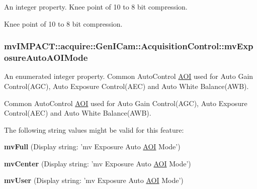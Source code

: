 An integer property. Knee point of 10 to 8 bit compression. 

Knee point of 10 to 8 bit compression. \hypertarget{classmv_i_m_p_a_c_t_1_1acquire_1_1_gen_i_cam_1_1_acquisition_control_a3121267e92f554eb04e266b80032ca66}{
\subsubsection[{mv\+Exposure\+Auto\+A\+O\+I\+Mode}]{ mv\+I\+M\+P\+A\+C\+T\+::acquire\+::\+Gen\+I\+Cam\+::\+Acquisition\+Control\+::mv\+Exposure\+Auto\+A\+O\+I\+Mode}}\label{classmv_i_m_p_a_c_t_1_1acquire_1_1_gen_i_cam_1_1_acquisition_control_a3121267e92f554eb04e266b80032ca66}


An enumerated integer property. Common Auto\+Control \hyperlink{struct_a_o_i}{A\+O\+I} used for Auto Gain Control(\+A\+G\+C), Auto Exposure Control(\+A\+E\+C) and Auto White Balance(\+A\+W\+B). 

Common Auto\+Control \hyperlink{struct_a_o_i}{A\+O\+I} used for Auto Gain Control(\+A\+G\+C), Auto Exposure Control(\+A\+E\+C) and Auto White Balance(\+A\+W\+B).

The following string values might be valid for this feature\+:
\begin{DoxyItemize}
\item {\bfseries mv\+Full} (Display string\+: 'mv Exposure Auto \hyperlink{struct_a_o_i}{A\+O\+I} Mode')
\item {\bfseries mv\+Center} (Display string\+: 'mv Exposure Auto \hyperlink{struct_a_o_i}{A\+O\+I} Mode')
\item {\bfseries mv\+User} (Display string\+: 'mv Exposure Auto \hyperlink{struct_a_o_i}{A\+O\+I} Mode')
\end{DoxyItemize}


